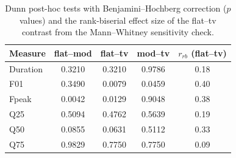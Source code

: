 \begin{table}[!ht]
\centering
\caption{Dunn post-hoc tests with Benjamini--Hochberg correction ($p$ values) and the
rank-biserial effect size of the flat--tv contrast from the Mann--Whitney
sensitivity check.}
\label{tab:dunn}
\footnotesize
\begin{tabular}{lcccc}
\toprule
Measure & flat--mod & flat--tv & mod--tv & $r_{rb}$ (flat--tv)\\
\midrule
Duration & 0.3210 & 0.3210 & 0.9786 & 0.18\\
F01 & 0.3490 & 0.0079 & 0.0459 & 0.40\\
Fpeak & 0.0042 & 0.0129 & 0.9048 & 0.38\\
Q25 & 0.5094 & 0.4762 & 0.5639 & 0.19\\
Q50 & 0.0855 & 0.0631 & 0.5112 & 0.33\\
Q75 & 0.9829 & 0.7750 & 0.7750 & 0.09\\
\bottomrule
\end{tabular}
\end{table}

